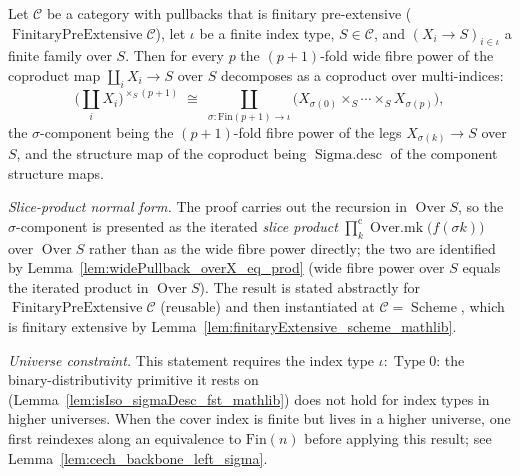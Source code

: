\begin{lemma}
  \label{lem:coproduct_distrib_fibrePower}
  Let \(\mathcal{C}\) be a category with pullbacks that is finitary pre-extensive
  (\(\operatorname{FinitaryPreExtensive}\mathcal{C}\)), let \(\iota\) be a finite index type,
  \(S \in \mathcal{C}\), and \((X_i \to S)_{i \in \iota}\) a finite family over \(S\). Then for every
  \(p\) the \((p+1)\)-fold wide fibre power of the coproduct map \(\coprod_i X_i \to S\) over \(S\)
  decomposes as a coproduct over multi-indices:
  \[
    \bigl(\textstyle\coprod_{i} X_i\bigr)^{\times_S (p+1)}
      \;\cong\;
    \coprod_{\sigma : \mathrm{Fin}(p+1) \to \iota}
      \bigl(X_{\sigma(0)} \times_S \cdots \times_S X_{\sigma(p)}\bigr),
  \]
  the \(\sigma\)-component being the \((p+1)\)-fold fibre power of the legs \(X_{\sigma(k)} \to S\)
  over \(S\), and the structure map of the coproduct being
  \(\operatorname{Sigma.desc}\) of the component structure maps.

  \emph{Slice-product normal form.} The proof carries out the recursion in
  \(\operatorname{Over} S\), so the \(\sigma\)-component is presented as the iterated \emph{slice
  product} \(\prod^{\mathrm{c}}_{k}\operatorname{Over.mk}\bigl(f(\sigma k)\bigr)\) over
  \(\operatorname{Over} S\) rather than as the wide fibre power directly; the two are identified by
  Lemma~\ref{lem:widePullback_overX_eq_prod} (wide fibre power over \(S\) equals the iterated product in
  \(\operatorname{Over} S\)). The result is stated
  abstractly for \(\operatorname{FinitaryPreExtensive}\mathcal{C}\) (reusable)
  and then instantiated at \(\mathcal{C} = \operatorname{Scheme}\), which is finitary extensive by
  Lemma~\ref{lem:finitaryExtensive_scheme_mathlib}.

  \emph{Universe constraint.} This statement requires the index type \(\iota : \operatorname{Type} 0\):
  the binary-distributivity primitive it rests on (Lemma~\ref{lem:isIso_sigmaDesc_fst_mathlib}) does not
  hold for index types in higher universes. When the cover index is finite but lives in a higher
  universe, one first reindexes along an equivalence to \(\mathrm{Fin}(n)\) before applying this
  result; see Lemma~\ref{lem:cech_backbone_left_sigma}.
\end{lemma}
